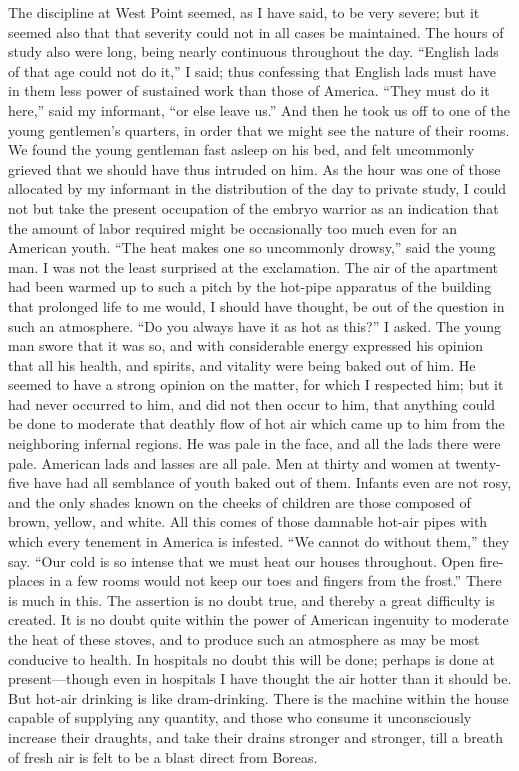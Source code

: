 The discipline at West Point seemed, as I have said, to be very
severe; but it seemed also that that severity could not in all
cases be maintained.  The hours of study also were long, being
nearly continuous throughout the day.  ``English lads of that age
could not do it,'' I said; thus confessing that English lads must
have in them less power of sustained work than those of America.
``They must do it here,'' said my informant, ``or else leave us.''  And
then he took us off to one of the young gentlemen's quarters, in
order that we might see the nature of their rooms.  We found the
young gentleman fast asleep on his bed, and felt uncommonly grieved
that we should have thus intruded on him.  As the hour was one of
those allocated by my informant in the distribution of the day to
private study, I could not but take the present occupation of the
embryo warrior as an indication that the amount of labor required
might be occasionally too much even for an American youth.  ``The
heat makes one so uncommonly drowsy,'' said the young man.  I was
not the least surprised at the exclamation.  The air of the
apartment had been warmed up to such a pitch by the hot-pipe
apparatus of the building that prolonged life to me would, I should
have thought, be out of the question in such an atmosphere.  ``Do
you always have it as hot as this?'' I asked.  The young man swore
that it was so, and with considerable energy expressed his opinion
that all his health, and spirits, and vitality were being baked out
of him.  He seemed to have a strong opinion on the matter, for
which I respected him; but it had never occurred to him, and did
not then occur to him, that anything could be done to moderate that
deathly flow of hot air which came up to him from the neighboring
infernal regions.  He was pale in the face, and all the lads there
were pale.  American lads and lasses are all pale.  Men at thirty
and women at twenty-five have had all semblance of youth baked out
of them.  Infants even are not rosy, and the only shades known on
the cheeks of children are those composed of brown, yellow, and
white.  All this comes of those damnable hot-air pipes with which
every tenement in America is infested.  ``We cannot do without
them,'' they say.  ``Our cold is so intense that we must heat our
houses throughout.  Open fire-places in a few rooms would not keep
our toes and fingers from the frost.''  There is much in this.  The
assertion is no doubt true, and thereby a great difficulty is
created.  It is no doubt quite within the power of American
ingenuity to moderate the heat of these stoves, and to produce such
an atmosphere as may be most conducive to health.  In hospitals no
doubt this will be done; perhaps is done at present---though even in
hospitals I have thought the air hotter than it should be.  But
hot-air drinking is like dram-drinking.  There is the machine
within the house capable of supplying any quantity, and those who
consume it unconsciously increase their draughts, and take their
drains stronger and stronger, till a breath of fresh air is felt to
be a blast direct from Boreas.

